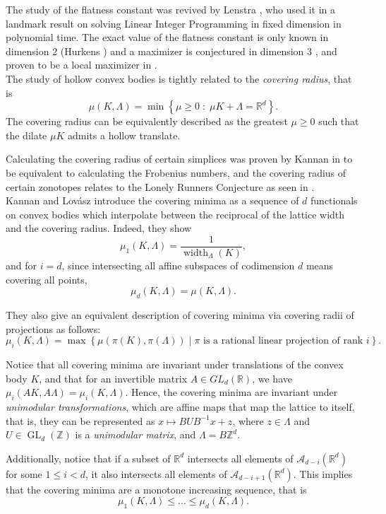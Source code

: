 \documentclass{amsart}
\theoremstyle{definition}
\theoremstyle{remark}
\newcommand{\A}{\mathcal{A}}
\newcommand{\R}{\mathbb{R}}
\newcommand{\Z}{\mathbb{Z}}
\begin{document}
The study of the flatness constant was revived by Lenstra \cite{Lenstra}, who used it in a landmark result on solving Linear Integer Programming in fixed dimension in polynomial time. The exact value of the flatness constant is only known in dimension 2 (Hurkens \cite{Hurkens}) and a maximizer is conjectured in dimension 3 \cite{CodenottiSantos}, and proven to be a local maximizer in \cite{LocalMax}. \\




The study of hollow convex bodies is tightly related to the \textit{covering radius}, that is
$$\mu(K,\Lambda)=\min\left\{ \mu\geq 0\; :\; \mu K+\Lambda=\R^d \right\}.$$
The covering radius can be equivalently described as the greatest $\mu\geqslant 0$ such that the dilate $\mu K$ admits a hollow translate.

Calculating the covering radius of certain simplices was proven by Kannan in \cite{Kannan} to be equivalent to calculating the Frobenius numbers, and the covering radius of certain zonotopes relates to the Lonely Runners Conjecture as seen in \cite{MalikiosisSchymura}.\\

Kannan and Lov\' asz introduce the covering minima as a sequence of $d$ functionals on convex bodies which interpolate between the reciprocal of the lattice width and the covering radius. Indeed, they show 
$$\mu_1(K,\Lambda)=\frac{1}{\operatorname{width}_\Lambda(K)},$$
and for $i=d$, since intersecting all affine subspaces of codimension $d$ means covering all points, 
$$\mu_d(K,\Lambda)=\mu(K,\Lambda).$$

They also give an equivalent description of covering minima via covering radii of projections as follows:
 $$\mu_i(K, \Lambda)=\max\left\{ \mu(\pi(K), \pi(\Lambda ))\;| \; \pi \text{ is a rational linear projection of rank }i\right\}. $$


Notice that all covering minima are invariant under translations of the convex body $K$, and that for an invertible matrix $A\in GL_d(\R)$, we have $\mu_i(AK, A\Lambda)=\mu_i(K,\Lambda)$. Hence, the covering minima are invariant under \textit{unimodular transformations}, which are affine maps that map the lattice to itself, that is, they can be represented as $x\mapsto BUB^{-1}x+z$, where $z\in \Lambda$ and $U\in \operatorname{GL}_d(\Z)$ is a \textit{unimodular matrix}, and $\Lambda= B\Z^d$.

Additionally, notice that if a subset of $\R^d$ intersects all elements of $\A_{d-i}(\R^d)$ for some $1\leqslant i< d$, it also intersects all elements of $\A_{d-i+1}(\R^d)$. This implies that the covering minima are a monotone increasing sequence, that is
$$\mu_1(K,\Lambda)\leqslant \dots \leqslant \mu_d(K,\Lambda).$$
\end{document}
